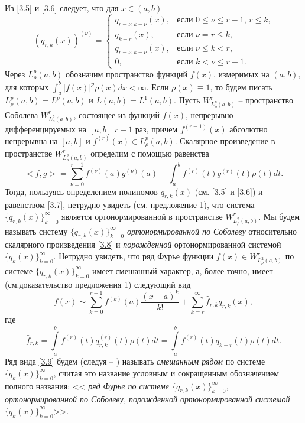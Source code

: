  Из \eqref{3.5} и \eqref{3.6} следует, что для $x\in (a,b)$
 \begin{equation}\label{3.7}
(q_{r,k}(x))^{(\nu)} =\begin{cases}q_{r-\nu,k-\nu}(x),&\text{если $0\le\nu\le r-1$, $r\le k$,}\\
q_{k-r}(x),&\text{если  $\nu=r\le k$,}\\
q_{r-\nu,k-\nu}(x),&\text{если $\nu\le k< r$,}\\
0,&\text{если $k< \nu\le r-1$}.
  \end{cases}
\end{equation}
Через $L^p_\rho(a,b)$ обозначим пространство  функций $f(x)$, измеримых  на  $(a,b)$, для которых $\int_a^b|f(x)|^p\rho(x)dx<\infty$.
Если $\rho(x)\equiv1$, то будем писать $L^p_\rho(a,b)=L^p(a,b)$ и $L(a,b)=L^1(a,b)$.
Пусть $W^r_{L^p_\rho(a,b)}$ -- пространство Соболева $W^r_{L^p_\rho(a,b)}$, состоящее из функций $f(x)$, непрерывно дифференцируемых на $[a,b]$ $r-1$ раз, причем $f^{(r-1)}(x)$ абсолютно непрерывна на $[a,b]$  и $f^{(r)}(x)\in L^p_\rho(a,b)$.
Скалярное произведение в пространстве $W^r_{L^2_\rho(a,b)}$ определим с помощью равенства
\begin{equation}\label{3.8}
<f,g>=\sum_{\nu=0}^{r-1}f^{(\nu)}(a)g^{(\nu)}(a)+\int_{a}^{b} f^{(r)}(t)g^{(r)}(t)\rho(t) dt.
\end{equation}
Тогда, пользуясь определением полиномов $q_{r,k}(x)$ (см. \eqref{3.5} и \eqref{3.6}) и равенством  \eqref{3.7}, нетрудно увидеть (см. предложение 1),  что система $\{q_{r,k}(x)\}_{k=0}^\infty$ является ортонормированной в пространстве $W^r_{L^2_\rho(a,b)}$.  Мы будем называть систему $\{q_{r,k}(x)\}_{k=0}^\infty$ \textit{ ортонормированной по Соболеву } относительно скалярного произведения \eqref{3.8} и  \textit{ порожденной} ортонормированной системой $\{q_{k}(x)\}_{k=0}^\infty$.
Нетрудно увидеть,  что ряд Фурье функции $f(x)\in W^r_{L^2_\rho(a,b)}$ по системе  $\{q_{r,k}(x)\}_{k=0}^\infty$ имеет смешанный характер, а, более точно, имеет (см.доказательство предложения 1) следующий вид
  \begin{equation}\label{3.9}
f(x)\sim \sum_{k=0}^{r-1} f^{(k)}(a)\frac{(x-a)^k}{k!}+ \sum_{k=r}^\infty \hat f_{r,k}q_{r,k}(x),
\end{equation}
где
  \begin{equation}\label{3.10}
 \hat f_{r,k}=\int\limits_a^b f^{(r)}(t) q^{(r)}_{r,k}(t)\rho(t)dt=\int\limits_a^b f^{(r)}(t) q_{k-r}(t)\rho(t)dt.
\end{equation}
Ряд  вида \eqref{3.9} будем (следуя  \cite{Shar11} -- \cite{SHII})   называть \textit{ смешанным рядом} по  системе $\{q_{k}(x)\}_{k=0}^\infty$, считая это название условным и сокращенным обозначением полного названия: <<\textit{ ряд Фурье по системе  $\{q_{r,k}(x)\}_{k=0}^\infty$, ортонормированной по Соболеву, порожденной ортонормированной системой $\{q_{k}(x)\}_{k=0}^\infty$}>>.
